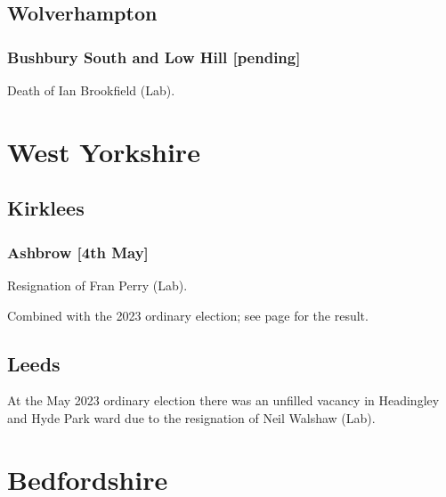 \documentclass[a4paper,openany]{book}
\begin{document}
\begin{resultsiii}
\subsection*{Wolverhampton}

\subsubsection*{Bushbury South and Low Hill \hspace*{\fill}\nolinebreak[1]%
	\enspace\hspace*{\fill}
	[pending]}


Death of Ian Brookfield (Lab).

\section{West Yorkshire}

\subsection*{Kirklees}

\subsubsection*{Ashbrow \hspace*{\fill}\nolinebreak[1]%
	\enspace\hspace*{\fill}
	[4th May]}


Resignation of Fran Perry (Lab).

Combined with the 2023 ordinary election; see page \pageref{KirkleesAshbrow} for the result.

\subsection*{Leeds}

At the May 2023 ordinary election there was an unfilled vacancy in Headingley and Hyde Park ward due to the resignation of Neil Walshaw (Lab).%

\section{Bedfordshire}


\end{resultsiii}
\end{document}
